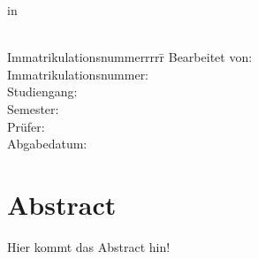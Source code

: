 \begin{centering}
		\Large \textbf{\Institution}\\
		\Large \Programme \\
		\vfill
		\LARGE \textbf{\Title} \\
		\Subtitle \\
		\vfill
		\LARGE \AsssignmentName \\ %
		\Large in \\
		\LARGE  \Class \\
		\vfill
		\begin{small}
			\begin{doublespace}
				\begin{tabbing}
					Immatrikulationsnummerrrrr\=\kill
					Bearbeitet von:\>\Name\\
					Immatrikulationsnummer:\>\MatrikelNummer\\
					Studiengang:\>\Programme\\
					Semester:\>\Semester\\
					Prüfer:\>\Supervisor\\
					Abgabedatum:\>\Date
				\end{tabbing}
			\end{doublespace}
		\end{small}
		
	\end{centering}\vspace{1cm}

\newpage
\tableofcontents
\listoftables
\listoffigures
\newpage
{}


\section{Abstract}
Hier kommt das Abstract hin!
\newpage